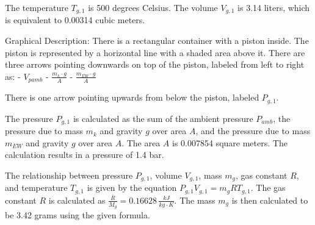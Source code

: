 The temperature \( T_{g,1} \) is 500 degrees Celsius.
The volume \( V_{g,1} \) is 3.14 liters, which is equivalent to 0.00314 cubic meters.

Graphical Description:
There is a rectangular container with a piston inside. The piston is represented by a horizontal line with a shaded area above it. There are three arrows pointing downwards on top of the piston, labeled from left to right as:
- \( V_{pamb} \)
- \( \frac{m_{k} \cdot g}{A} \)
- \( \frac{m_{EW} \cdot g}{A} \)

There is one arrow pointing upwards from below the piston, labeled \( P_{g,1} \).

The pressure \( P_{g,1} \) is calculated as the sum of the ambient pressure \( P_{amb} \), the pressure due to mass \( m_{k} \) and gravity \( g \) over area \( A \), and the pressure due to mass \( m_{EW} \) and gravity \( g \) over area \( A \). The area \( A \) is 0.007854 square meters. The calculation results in a pressure of 1.4 bar.

The relationship between pressure \( P_{g,1} \), volume \( V_{g,1} \), mass \( m_{g} \), gas constant \( R \), and temperature \( T_{g,1} \) is given by the equation \( P_{g,1} V_{g,1} = m_{g} R T_{g,1} \). The gas constant \( R \) is calculated as \( \frac{\bar{R}}{M_{g}} = 0.16628 \, \frac{kJ}{kg \cdot K} \). The mass \( m_{g} \) is then calculated to be 3.42 grams using the given formula.